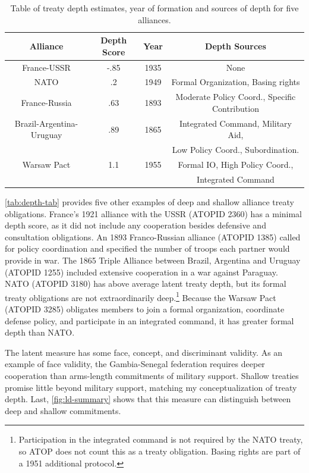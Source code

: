 \documentclass[12pt]{article}
\begin{document}
\begin{table}[hbt!]
\begin{center}
\begin{tabular}{cccc}
   Alliance  & Depth Score & Year & Depth Sources  \\
\hline
 France-USSR   & -.85  & 1935  & None \\
 NATO & .2 & 1949 & Formal Organization, Basing rights \\ 
 France-Russia   & .63 & 1893 & Moderate Policy Coord., Specific Contribution \\
 Brazil-Argentina-Uruguay & .89 & 1865 & Integrated Command, Military Aid, \\
                         &      &      &  Low Policy Coord., Subordination. \\
 Warsaw Pact & 1.1  & 1955 &  Formal IO, High Policy Coord., \\
             &      &      & Integrated Command  \\ 
\hline
\end{tabular}
\caption{Table of treaty depth estimates, year of formation and sources of depth for five alliances. }
\label{tab:depth-tab}
\end{center} 
\end{table}


\autoref{tab:depth-tab} provides five other examples of deep and shallow alliance treaty obligations.
France's 1921 alliance with the USSR (ATOPID 2360) has a minimal depth score, as it did not include any cooperation besides defensive and consultation obligations. 
An 1893 Franco-Russian alliance (ATOPID 1385) called for policy coordination and specified the number of troops each partner would provide in war.   
The 1865 Triple Alliance between Brazil, Argentina and Uruguay (ATOPID 1255) included extensive cooperation in a war against Paraguay. 
NATO (ATOPID 3180) has above average latent treaty depth, but its formal treaty obligations are not extraordinarily deep.\footnote{Participation in the integrated command is not required by the NATO treaty, so ATOP does not count this as a treaty obligation. Basing rights are part of a 1951 additional protocol.}
Because the Warsaw Pact (ATOPID 3285) obligates members to join a formal organization, coordinate defense policy, and participate in an integrated command, it has greater formal depth than NATO. 


The latent measure has some face, concept, and discriminant validity. 
As an example of face validity, the Gambia-Senegal federation requires deeper cooperation than arms-length commitments of military support. 
Shallow treaties promise little beyond military support, matching my conceptualization of treaty depth. 
Last, \autoref{fig:ld-summary} shows that this measure can distinguish between deep and shallow commitments. 
\end{document}
